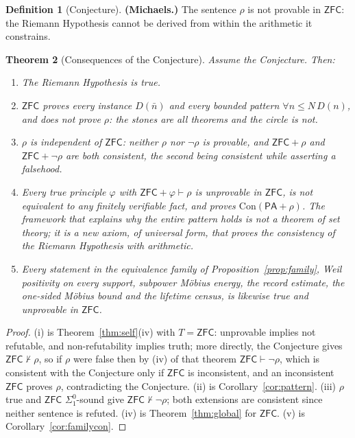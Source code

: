 \documentclass[11pt]{article}
\newtheorem{theorem}{Theorem}[section]
\theoremstyle{definition}
\newtheorem{definition}[theorem]{Definition}
\theoremstyle{remark}
\newcommand{\PA}{\mathsf{PA}}
\newcommand{\ZFC}{\mathsf{ZFC}}
\newcommand{\Con}{\mathrm{Con}}
\newcommand{\Sigone}{\Sigma^0_1}
\begin{document}
\begin{definition}[Conjecture]\label{conj}
\textbf{(Michaels.)} The sentence $\rho$ is not provable in $\ZFC$: the Riemann Hypothesis cannot be derived from within the arithmetic it constrains.
\end{definition}

\begin{theorem}[Consequences of the Conjecture]\label{thm:conj}
Assume the Conjecture. Then:
\begin{enumerate}
\item[(i)] The Riemann Hypothesis is true.
\item[(ii)] $\ZFC$ proves every instance $D(\bar n)$ and every bounded pattern $\forall n\le N\,D(n)$, and does not prove $\rho$: the stones are all theorems and the circle is not.
\item[(iii)] $\rho$ is independent of $\ZFC$: neither $\rho$ nor $\neg\rho$ is provable, and $\ZFC+\rho$ and $\ZFC+\neg\rho$ are both consistent, the second being consistent while asserting a falsehood.
\item[(iv)] Every true principle $\varphi$ with $\ZFC+\varphi\vdash\rho$ is unprovable in $\ZFC$, is not equivalent to any finitely verifiable fact, and proves $\Con(\PA+\rho)$. The framework that explains why the entire pattern holds is not a theorem of set theory; it is a new axiom, of universal form, that proves the consistency of the Riemann Hypothesis with arithmetic.
\item[(v)] Every statement in the equivalence family of Proposition~\ref{prop:family}, Weil positivity on every support, subpower M\"obius energy, the record estimate, the one-sided M\"obius bound and the lifetime census, is likewise true and unprovable in $\ZFC$.
\end{enumerate}
\end{theorem}

\begin{proof}
(i) is Theorem~\ref{thm:self}(iv) with $T=\ZFC$: unprovable implies not refutable, and non-refutability implies truth; more directly, the Conjecture gives $\ZFC\nvdash\rho$, so if $\rho$ were false then by (iv) of that theorem $\ZFC\vdash\neg\rho$, which is consistent with the Conjecture only if $\ZFC$ is inconsistent, and an inconsistent $\ZFC$ proves $\rho$, contradicting the Conjecture. (ii) is Corollary~\ref{cor:pattern}. (iii) $\rho$ true and $\ZFC$ $\Sigone$-sound give $\ZFC\nvdash\neg\rho$; both extensions are consistent since neither sentence is refuted. (iv) is Theorem~\ref{thm:global} for $\ZFC$. (v) is Corollary~\ref{cor:familycon}.
\end{proof}
\end{document}
